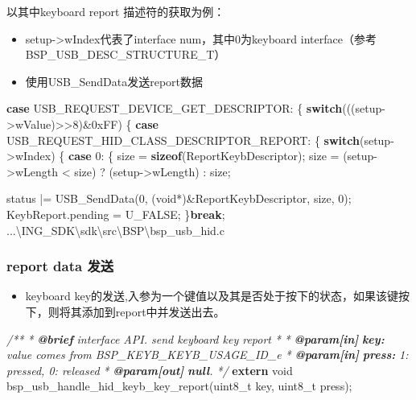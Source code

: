 \documentclass[
  12pt,
]{book}
\newenvironment{Shaded}{\begin{snugshade}}{\end{snugshade}}
\newcommand{\AnnotationTok}[1]{\textcolor[rgb]{0.56,0.35,0.01}{\textbf{\textit{#1}}}}
\newcommand{\BaseNTok}[1]{\textcolor[rgb]{0.00,0.00,0.81}{#1}}
\newcommand{\CommentTok}[1]{\textcolor[rgb]{0.56,0.35,0.01}{\textit{#1}}}
\newcommand{\CommentVarTok}[1]{\textcolor[rgb]{0.56,0.35,0.01}{\textbf{\textit{#1}}}}
\newcommand{\ControlFlowTok}[1]{\textcolor[rgb]{0.13,0.29,0.53}{\textbf{#1}}}
\newcommand{\DataTypeTok}[1]{\textcolor[rgb]{0.13,0.29,0.53}{#1}}
\newcommand{\DecValTok}[1]{\textcolor[rgb]{0.00,0.00,0.81}{#1}}
\newcommand{\KeywordTok}[1]{\textcolor[rgb]{0.13,0.29,0.53}{\textbf{#1}}}
\newcommand{\NormalTok}[1]{#1}
\providecommand{\tightlist}{%
  \setlength{\itemsep}{0pt}\setlength{\parskip}{0pt}}
\begin{document}
以其中keyboard report 描述符的获取为例：

\begin{itemize}
\tightlist
\item
  setup-\textgreater wIndex代表了interface num，其中0为keyboard interface（参考BSP\_USB\_DESC\_STRUCTURE\_T）
\item
  使用USB\_SendData发送report数据
\end{itemize}

\begin{Shaded}
\begin{Highlighting}[]
\ControlFlowTok{case}\NormalTok{ USB_REQUEST_DEVICE_GET_DESCRIPTOR:}
\NormalTok{\{}
  \ControlFlowTok{switch}\NormalTok{(((setup->wValue)>>}\DecValTok{8}\NormalTok{)&}\BaseNTok{0xFF}\NormalTok{)}
\NormalTok{  \{}
    \ControlFlowTok{case}\NormalTok{ USB_REQUEST_HID_CLASS_DESCRIPTOR_REPORT:}
\NormalTok{    \{}
      \ControlFlowTok{switch}\NormalTok{(setup->wIndex)}
\NormalTok{      \{}
        \ControlFlowTok{case} \DecValTok{0}\NormalTok{:}
\NormalTok{        \{}
\NormalTok{          size = }\KeywordTok{sizeof}\NormalTok{(ReportKeybDescriptor);}
\NormalTok{          size = (setup->wLength < size) ? (setup->wLength) : size;}

\NormalTok{          status |= USB_SendData(}\DecValTok{0}\NormalTok{, (}\DataTypeTok{void}\NormalTok{*)&ReportKeybDescriptor, size, }\DecValTok{0}\NormalTok{);}
\NormalTok{          KeybReport.pending = U_FALSE;}
\NormalTok{        \}}\ControlFlowTok{break}\NormalTok{;}
\NormalTok{        ...\textbackslash{}ING_SDK\textbackslash{}sdk\textbackslash{}src\textbackslash{}BSP\textbackslash{}bsp_usb_hid.c}
\end{Highlighting}
\end{Shaded}

\hypertarget{report-data-ux53d1ux9001}{%
\subsubsection{report data 发送}\label{report-data-ux53d1ux9001}}

\begin{itemize}
\tightlist
\item
  keyboard key的发送,入参为一个键值以及其是否处于按下的状态，如果该键按下，则将其添加到report中并发送出去。
\end{itemize}

\begin{Shaded}
\begin{Highlighting}[]
\CommentTok{/**}
\CommentTok{ * }\AnnotationTok{@brief}\CommentTok{ interface API. send keyboard key report}
\CommentTok{ *}
\CommentTok{ * }\AnnotationTok{@param[in]}\CommentTok{ }\CommentVarTok{key:}\CommentTok{ value comes from BSP_KEYB_KEYB_USAGE_ID_e}
\CommentTok{ * }\AnnotationTok{@param[in]}\CommentTok{ }\CommentVarTok{press:}\CommentTok{ 1: pressed, 0: released}
\CommentTok{ * }\AnnotationTok{@param[out]}\CommentTok{ }\CommentVarTok{null}\CommentTok{. }
\CommentTok{ */}
\KeywordTok{extern} \DataTypeTok{void}\NormalTok{ bsp_usb_handle_hid_keyb_key_report(}\DataTypeTok{uint8_t}\NormalTok{ key, }\DataTypeTok{uint8_t}\NormalTok{ press);}
\end{Highlighting}
\end{Shaded}
\end{document}
